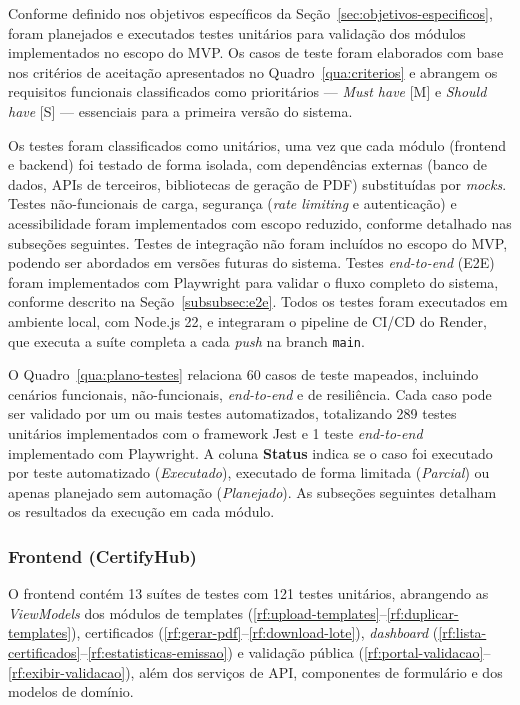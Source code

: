 
Conforme definido nos objetivos específicos da Seção~\ref{sec:objetivos-especificos}, foram planejados e executados testes unitários para validação dos módulos implementados no escopo do MVP. Os casos de teste foram elaborados com base nos critérios de aceitação apresentados no Quadro~\ref{qua:criterios} e abrangem os requisitos funcionais classificados como prioritários — \textit{Must have} [M] e \textit{Should have} [S] — essenciais para a primeira versão do sistema.

Os testes foram classificados como unitários, uma vez que cada módulo (frontend e backend) foi testado de forma isolada, com dependências externas (banco de dados, APIs de terceiros, bibliotecas de geração de PDF) substituídas por \textit{mocks}. Testes não-funcionais de carga, segurança (\textit{rate limiting} e autenticação) e acessibilidade foram implementados com escopo reduzido, conforme detalhado nas subseções seguintes. Testes de integração não foram incluídos no escopo do MVP, podendo ser abordados em versões futuras do sistema. Testes \textit{end-to-end} (E2E) foram implementados com Playwright para validar o fluxo completo do sistema, conforme descrito na Seção~\ref{subsubsec:e2e}. Todos os testes foram executados em ambiente local, com Node.js 22, e integraram o pipeline de CI/CD do Render, que executa a suíte completa a cada \textit{push} na branch \texttt{main}.



O Quadro~\ref{qua:plano-testes} relaciona 60 casos de teste mapeados, incluindo cenários funcionais, não-funcionais, \textit{end-to-end} e de resiliência. Cada caso pode ser validado por um ou mais testes automatizados, totalizando 289 testes unitários implementados com o framework Jest e 1 teste \textit{end-to-end} implementado com Playwright. A coluna \textbf{Status} indica se o caso foi executado por teste automatizado (\textit{Executado}), executado de forma limitada (\textit{Parcial}) ou apenas planejado sem automação (\textit{Planejado}). As subseções seguintes detalham os resultados da execução em cada módulo.

\subsubsection{Frontend (CertifyHub)}

O frontend contém 13 suítes de testes com 121 testes unitários, abrangendo as \textit{ViewModels} dos módulos de templates (\ref{rf:upload-templates}--\ref{rf:duplicar-templates}), certificados (\ref{rf:gerar-pdf}--\ref{rf:download-lote}), \textit{dashboard} (\ref{rf:lista-certificados}--\ref{rf:estatisticas-emissao}) e validação pública (\ref{rf:portal-validacao}--\ref{rf:exibir-validacao}), além dos serviços de API, componentes de formulário e dos modelos de domínio.

